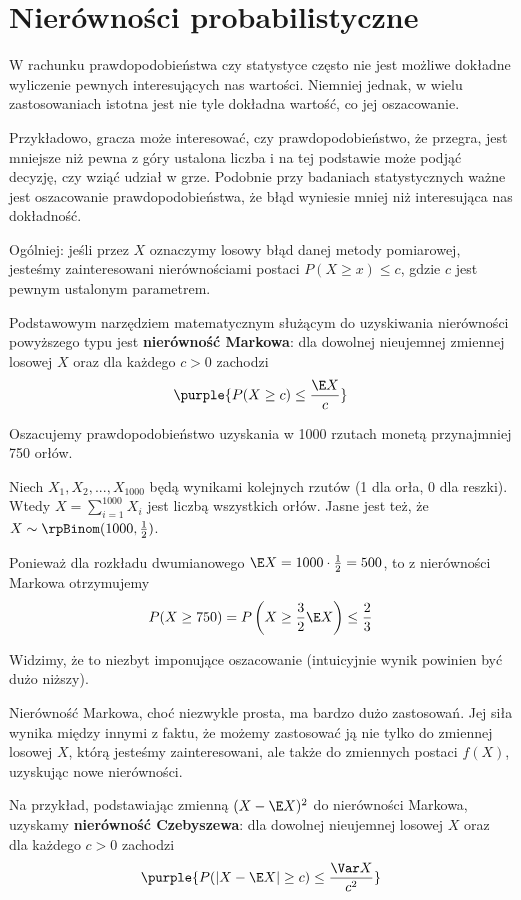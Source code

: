 \section{Nierówności probabilistyczne}

W rachunku prawdopodobieństwa czy statystyce często nie jest możliwe dokładne wyliczenie pewnych interesujących nas wartości. Niemniej jednak, w wielu zastosowaniach istotna jest nie tyle dokładna wartość, co jej oszacowanie.

Przykładowo, gracza może interesować, czy prawdopodobieństwo, że przegra, jest mniejsze niż pewna z góry ustalona liczba i na tej podstawie może podjąć decyzję, czy wziąć udział w grze. Podobnie przy badaniach statystycznych ważne jest oszacowanie prawdopodobieństwa, że błąd wyniesie mniej niż interesująca nas dokładność.

Ogólniej: jeśli przez $X$ oznaczymy losowy błąd danej metody pomiarowej, jesteśmy zainteresowani nierównościami postaci $P(X \geq x) \leq c$, gdzie $c$ jest pewnym ustalonym parametrem.
\bigskip

Podstawowym narzędziem matematycznym służącym do uzyskiwania nierówności powyższego typu jest \textbf{nierówność Markowa}: dla dowolnej nieujemnej zmiennej losowej $X$ oraz dla każdego $c > 0$ zachodzi
$$\purple{P(X \geq c) \leq \frac{\E X}{c}}$$

\begin{example}
    Oszacujemy prawdopodobieństwo uzyskania w 1000 rzutach monetą przynajmniej 750 orłów.
    
    Niech $X_1, X_2, ... ,X_{1000}$ będą wynikami kolejnych rzutów (1 dla orła, 0 dla reszki). Wtedy $X = \sum_{i=1}^{1000} X_i$ jest liczbą wszystkich orłów. Jasne jest też, że $X \sim \rpBinom(1000, \frac{1}{2})$.

    Ponieważ dla rozkładu dwumianowego $\E X = 1000 \cdot \frac{1}{2} = 500$, to z nierówności Markowa otrzymujemy
    $$
    P(X \geq 750) = P\left(X \geq \frac{3}{2} \E X\right) \leq \frac{2}{3}
    $$
    
    Widzimy, że to niezbyt imponujące oszacowanie (intuicyjnie wynik powinien być dużo niższy).
\end{example}

Nierówność Markowa, choć niezwykle prosta, ma bardzo dużo zastosowań. Jej siła wynika między innymi z faktu, że możemy zastosować ją nie tylko do zmiennej losowej $X$, którą jesteśmy zainteresowani, ale także do zmiennych postaci $f(X)$, uzyskując nowe nierówności.

Na przykład, podstawiając zmienną $(X - \E X)^2$ do nierówności Markowa, uzyskamy \textbf{nierówność Czebyszewa}: dla dowolnej nieujemnej losowej $X$ oraz dla każdego $c > 0$ zachodzi
$$
\purple{P(|X - \E X| \geq c) \leq \frac{\Var X}{c^2}}
$$

